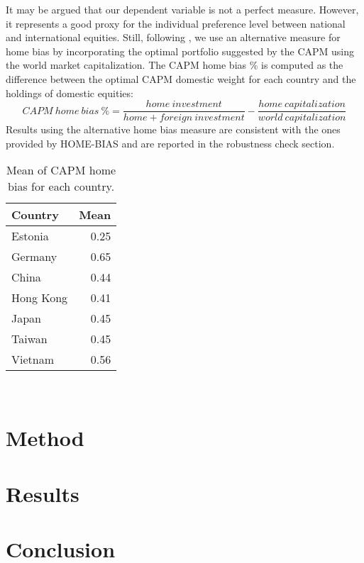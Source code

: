 \documentclass[a4paper, 12pt, english]{article}
\begin{document}
It may be argued that our dependent variable is not a perfect measure. However, it represents a good proxy for the individual preference level between national and international equities. Still, following \cite{morse2011patriotism}, we use an alternative measure for home bias by incorporating the optimal portfolio suggested by the CAPM using the world market capitalization. The CAPM home bias \% is computed as the difference between the optimal CAPM domestic weight for each country and the holdings of domestic equities:
\begin{equation}
     CAPM \: home \: bias\: \% = \frac{home\: investment}{home + foreign\: investment} - \frac{home\: capitalization}{world\: capitalization}
\end{equation}
Results using the alternative home bias measure are consistent with the ones provided by HOME-BIAS and are reported in the robustness check section.\\

\begin{table}[!htpb] 
    \centering
    \caption{Mean of CAPM home bias for each country.}
    \label{Tab:MeanHomeBias}
    
     \begin{tabular}{lr} 
        \toprule
        Country & Mean\\
        \midrule
             Estonia & 0.25 \\
             Germany & 0.65 \\
             China & 0.44  \\
             Hong Kong & 0.41 \\
             Japan & 0.45 \\
             Taiwan & 0.45 \\
             Vietnam & 0.56\\
        \bottomrule
    \end{tabular}\\  
\end{table}
\newpage

\section{Method}
\blindtext[1]

\newpage
\section{Results}
\blindtext[1]

\clearpage
\section{Conclusion}
\blindtext

\clearpage
\newpage

%
\newpage
\appendix
\end{document}
